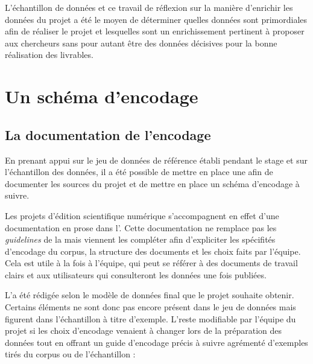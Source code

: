 L'échantillon de données et ce travail de réflexion sur la manière d'enrichir les données du projet a été le moyen de déterminer quelles données sont primordiales afin de réaliser le projet et lesquelles sont un enrichissement pertinent à proposer aux chercheurs sans pour autant être des données décisives pour la bonne réalisation des livrables.

 \section{Un schéma d’encodage}
    \subsection{La documentation de l’encodage}

En prenant appui sur le jeu de données \TEI de référence établi pendant le stage et sur l'échantillon des données, il a été possible de mettre en place une \ODD afin de documenter les sources du projet et de mettre en place un schéma d'encodage à suivre. 

Les projets d'édition scientifique numérique s'accompagnent en effet d'une documentation en prose dans l'\ODD. Cette documentation ne remplace pas les \textit{guidelines} de la \TEI mais viennent les compléter afin d'expliciter les spécifités d'encodage du corpus, la structure des documents et les choix faits par l'équipe. Cela est utile à la fois à l'équipe, qui peut se référer à des documents de travail clairs et aux utilisateurs qui consulteront les données une fois publiées. 

L'\ODD a été rédigée selon le modèle de données final que le projet souhaite obtenir. Certains éléments ne sont donc pas encore présent dans le jeu de données \TEI mais figurent dans l'échantillon à titre d'exemple. L'\ODD reste modifiable par l'équipe du projet si les choix d'encodage venaient à changer lors de la préparation des données tout en offrant un guide d'encodage précis à suivre agrémenté d'exemples tirés du corpus ou de l'échantillon : 

